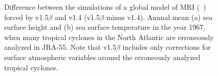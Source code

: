 \documentclass[dvipdfmx]{elsarticle_mod}
\begin{document}
\begin{figure}[h]
\centering
 \caption{Difference between the simulations of a global model of MRI (\citeauthor{Urakawa_et_al_2020}~\citeyear{Urakawa_et_al_2020}) forced by v1.5$\beta$ and v1.4 (v1.5$\beta$ minus v1.4). Annual mean (a) sea surface height and (b) sea surface temperature in the year 1967, when many tropical cyclones in the North Atlantic are erroneously analyzed in JRA-55. Note that v1.5$\beta$ includes only corrections for surface atmospheric variables around the erroneously analyzed tropical cyclones.}
  \label{fig:ssh-sst-v1_5-v1_4}
\end{figure}
\end{document}
